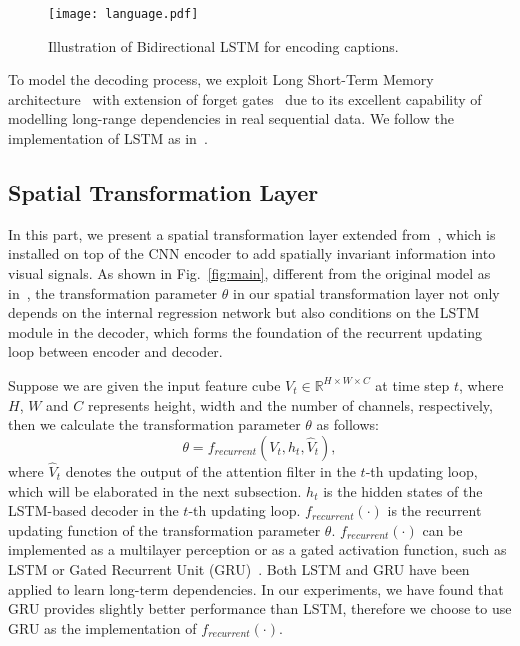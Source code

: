 \documentclass[10pt,twocolumn,letterpaper]{article}
\begin{document}
	\begin{figure}[h]
		\begin{center}
			\texttt{[image: language.pdf]}
		\end{center}
		\caption{Illustration of Bidirectional LSTM for encoding captions.}
		\label{fig:lan}
	\end{figure}
	
	
	To model the decoding process, we exploit Long Short-Term Memory architecture~\cite{hochreiter1997long} with extension of forget gates~\cite{gers2000learning} due to its excellent capability of modelling long-range dependencies in real sequential data. We follow the implementation of LSTM as in~\cite{zaremba2014recurrent}.
	
	\subsection{Spatial Transformation Layer}\label{sec:spatial invariance}
	In this part, we present a spatial transformation layer extended from~\cite{}, which is installed on top of the CNN encoder to add spatially invariant information into visual signals. As shown in Fig.~\ref{fig:main}, different from the original model as in~\cite{}, the transformation parameter $\theta$ in our spatial transformation layer not only depends on the internal regression network but also conditions on the LSTM module in the decoder, which forms the foundation of the recurrent updating loop between encoder and decoder.
	
	
	
	Suppose we are given the input feature cube $V_{t}\in {\mathbb{R}^{H \times W \times C}}$ at time step $t$, where $H$, $W$ and $C$ represents height, width and the number of channels, respectively, then we calculate the transformation parameter $\theta$ as follows:
	\begin{equation}\label{eq:theta}
	\theta=f_{recurrent}(V_{t},h_{t},\hat{V}_{t}),
	\end{equation}
	where $\hat{V}_{t}$ denotes the output of the attention filter in the $t$-th updating loop, which will be elaborated in the next subsection. $h_{t}$ is the hidden states of the LSTM-based decoder in the $t$-th updating loop. $f_{recurrent}(\cdot)$ is the recurrent updating function of the transformation parameter $\theta$. $f_{recurrent}(\cdot)$ can be implemented as a multilayer perception or as a gated activation function, such as LSTM or Gated Recurrent Unit (GRU)~\cite{cho2014learning}. Both LSTM and GRU have been applied to learn long-term dependencies. In our experiments, we have found that GRU provides slightly better performance than LSTM, therefore we choose to use GRU as the implementation of $f_{recurrent}(\cdot)$.
	
\end{document}
